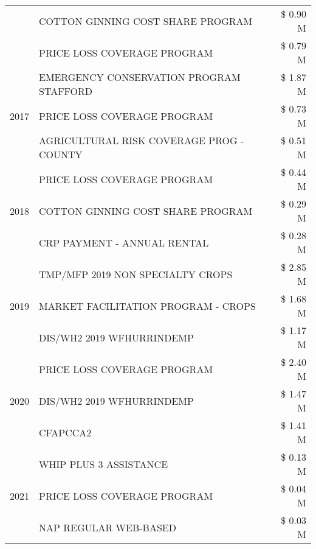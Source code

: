 \begin{tabular}{llr}
 & COTTON GINNING COST SHARE PROGRAM & \$ 0.90 M \\
 & PRICE LOSS COVERAGE PROGRAM & \$ 0.79 M \\
\cline{1-3}
\multirow[t]{3}{*}{2017} & EMERGENCY CONSERVATION PROGRAM STAFFORD & \$ 1.87 M \\
 & PRICE LOSS COVERAGE PROGRAM & \$ 0.73 M \\
 & AGRICULTURAL RISK COVERAGE PROG - COUNTY & \$ 0.51 M \\
\cline{1-3}
\multirow[t]{3}{*}{2018} & PRICE LOSS COVERAGE PROGRAM & \$ 0.44 M \\
 & COTTON GINNING COST SHARE PROGRAM & \$ 0.29 M \\
 & CRP PAYMENT - ANNUAL RENTAL & \$ 0.28 M \\
\cline{1-3}
\multirow[t]{3}{*}{2019} & TMP/MFP 2019 NON SPECIALTY CROPS & \$ 2.85 M \\
 & MARKET FACILITATION PROGRAM - CROPS & \$ 1.68 M \\
 & DIS/WH2 2019 WFHURRINDEMP & \$ 1.17 M \\
\cline{1-3}
\multirow[t]{3}{*}{2020} & PRICE LOSS COVERAGE PROGRAM & \$ 2.40 M \\
 & DIS/WH2 2019 WFHURRINDEMP & \$ 1.47 M \\
 & CFAPCCA2 & \$ 1.41 M \\
\cline{1-3}
\multirow[t]{3}{*}{2021} & WHIP PLUS 3 ASSISTANCE & \$ 0.13 M \\
 & PRICE LOSS COVERAGE PROGRAM & \$ 0.04 M \\
 & NAP REGULAR WEB-BASED & \$ 0.03 M \\
\cline{1-3}
\bottomrule
\end{tabular}
